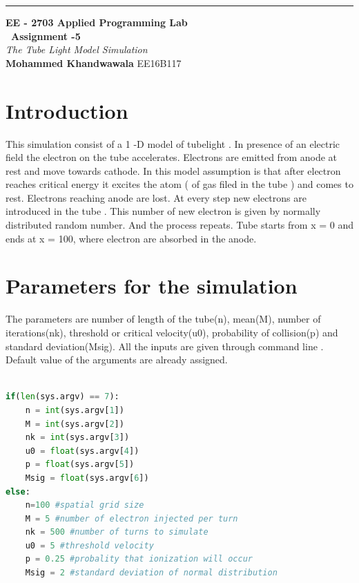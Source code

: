 \documentclass[a4paper]{article}
\begin{document}
\begin{titlepage}
	\raggedleft
	\rule{1pt}{\textheight} 
	\hspace{0.05\textwidth} 
	\parbox[b]{0.75\textwidth}{		
		{\LARGE\bfseries EE - 2703 Applied Programming Lab \\[0.5\baselineskip]  ~\huge Assignment -5}\\[2\baselineskip] 
		{\large\textit{The Tube Light Model Simulation}}\\[4\baselineskip] 
		{\Large\textbf{Mohammed Khandwawala}}
        \large EE16B117
		\vspace{0.5\textheight}  
	}

\end{titlepage}


\tableofcontents


\section{Introduction}
This simulation consist of a 1 -D model of tubelight . In presence of an electric field the electron on the tube accelerates. Electrons are emitted from anode at rest and move towards cathode. In this model assumption is that after electron reaches critical energy it excites the atom ( of gas filed in the tube ) and comes to rest. Electrons reaching anode are lost. At every step new electrons are introduced in the tube . This number of new electron is given by normally distributed random number. And the process repeats.
Tube starts from x = 0 and ends at x = 100, where electron are absorbed in the anode.
\section{Parameters for the simulation}
The parameters are number of length of the tube(n), mean(M), number of iterations(nk), threshold or critical velocity(u0), probability of collision(p) and standard deviation(Msig).
All the inputs are given through command line . Default value of the arguments are already assigned.
\begin{lstlisting}[language=Python]

if(len(sys.argv) == 7):
	n = int(sys.argv[1])
	M = int(sys.argv[2])
	nk = int(sys.argv[3])
	u0 = float(sys.argv[4])
	p = float(sys.argv[5])
    Msig = float(sys.argv[6])
else:
	n=100 #spatial grid size
	M = 5 #number of electron injected per turn
	nk = 500 #number of turns to simulate
	u0 = 5 #threshold velocity
	p = 0.25 #probality that ionization will occur
	Msig = 2 #standard deviation of normal distribution


\end{lstlisting}
\end{document}
